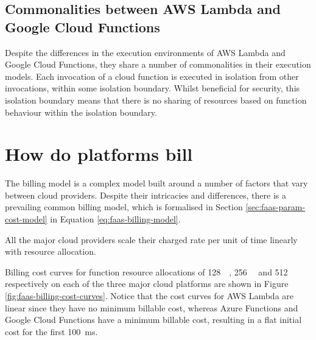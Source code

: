 \subsection{Commonalities between AWS Lambda and Google Cloud Functions}
Despite the differences in the execution environments of AWS Lambda and Google Cloud Functions, they share a number of commonalities in their execution models. Each invocation of a cloud function is executed in isolation from other invocations, within some isolation boundary. Whilst beneficial for security, this isolation boundary means that there is no sharing of resources based on function behaviour within the isolation boundary.

\section{How do \faas{} platforms bill \faaslong{}}
\label{sec:faas-billing-models}

The \faas{} billing model is a complex model built around a number of factors that vary between cloud providers. Despite their intricacies and differences, there is a prevailing common billing model, which is formalised in Section \ref{sec:faas-param-cost-model} in Equation \ref{eq:faas-billing-model}.

All the major cloud providers scale their charged rate per unit of time linearly with resource allocation.

Billing cost curves for function resource allocations of \SI{128}{\mega\byte}, \SI{256}{\mega\byte} and \SI{512}{\mega\byte} respectively on each of the three major cloud platforms are shown in Figure \ref{fig:faas-billing-cost-curves}. Notice that the cost curves for AWS Lambda are linear since they have no minimum billable cost, whereas Azure Functions and Google Cloud Functions have a minimum billable cost, resulting in a flat initial cost for the first \SI{100}{\milli\second}.

\begin{figure*}[htp]
    \centering
    \quad
    \quad
    \caption{\faas{} billing cost curves by cloud provider}
    \label{fig:faas-billing-cost-curves}
\end{figure*}

